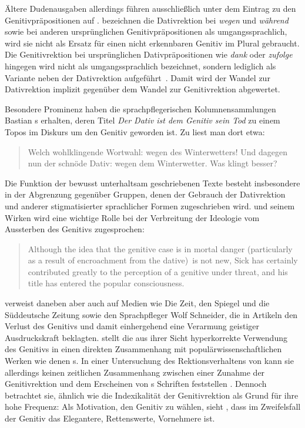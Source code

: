 Ältere Dudenausgaben allerdings führen \wegen{} ausschlie{\ss}lich unter dem Eintrag zu den Genitivpr{\"a}positionen auf \citep[s.][208]{Davies2006}. 
\citet[358]{Helbig.2017} bezeichnen die Dativrektion bei \textit{wegen }und \textit{w{\"a}hrend }sowie bei anderen urspr{\"u}nglichen Genitivpr{\"a}positionen als \glqq umgangssprachlich\grqq, wird sie nicht als Ersatz f{\"u}r einen nicht erkennbaren Genitiv im Plural gebraucht. 
Die Genitivrektion bei urspr{\"u}nglichen Dativpr{\"a}positionen wie \textit{dank }oder \textit{zufolge }hingegen wird nicht als umgangssprachlich bezeichnet, sondern lediglich als Variante neben der Dativrektion aufgef{\"u}hrt~\citep[s.][358]{Helbig.2017}. 
Damit wird der Wandel zur Dativrektion implizit gegenüber dem Wandel zur Genitivrektion abgewertet. 

Besondere Prominenz haben die sprachpflegerischen Kolumnensammlungen Bastian \citeauthor{Sick2006}s erhalten, deren Titel \textit{Der Dativ ist dem Genitiv sein Tod} zu einem Topos im Diskurs um den Genitiv geworden ist. 
Zu \wegen{} liest man dort etwa: 
\begin{quote} Welch wohlklingende Wortwahl: wegen des Winterwetters! Und dagegen nun der schnöde Dativ: wegen dem Winterwetter. Was klingt besser? \citep[101]{Sick2006} \end{quote}
Die Funktion der bewusst unterhaltsam geschriebenen Texte besteht insbesondere in der Abgrenzung gegenüber Gruppen, denen der Gebrauch der Dativrektion und anderer stigmatisierter sprachlicher Formen zugeschrieben wird.  
\citeauthor{Sick2006} und seinem Wirken wird eine wichtige Rolle bei der Verbreitung der Ideologie vom Aussterben des Genitivs zugesprochen: 
\begin{quote}Although the idea that the genitive case is in mortal danger (particularly as a result of encroachment from the dative)~is not new, Sick has certainly contributed greatly to the perception of a genitive under threat, and his title has entered the popular consciousness.~\citep[24]{Scott.2014}\end{quote}
\citet[323]{Langer.} verweist daneben aber auch auf Medien wie Die Zeit, den Spiegel und die S{\"u}ddeutsche Zeitung sowie den Sprachpfleger Wolf Schneider, die in Artikeln den Verlust des Genitivs und damit einhergehend eine {\glqq}Verarmung geistiger Ausdruckskraft{\grqq} beklagten. 
\citet[9]{Krause2012b} stellt die aus ihrer Sicht hyperkorrekte Verwendung des Genitivs in einen direkten Zusammenhang mit popul{\"a}rwissenschaftlichen Werken wie denen \citeauthor{Sick2006}s. 
In einer Untersuchung des Rektionsverhaltens von  kann sie allerdings keinen zeitlichen Zusammenhang zwischen einer Zunahme der Genitivrektion und dem Erscheinen von \citeauthor{Sick2006}s Schriften feststellen \citep[s.][347]{Krause2012a}. 
Dennoch betrachtet sie, ähnlich wie \citet[211]{Becker2011} die Indexikalität der Genitivrektion als Grund für ihre hohe Frequenz: 
Als Motivation, den Genitiv zu w{\"a}hlen, sieht \citet[19]{Krause2012b}, {\glqq}dass im Zweifelsfall der Genitiv das Elegantere, Rettenswerte, Vornehmere ist{\grqq}. 

